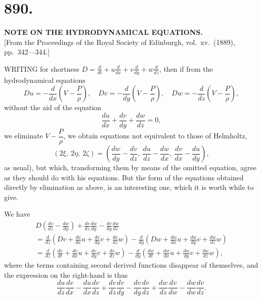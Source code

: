 \documentclass[11pt,a4paper]{book}
\begin{document}
\section*{890.}
\begin{center}
{\large\bfseries NOTE ON THE HYDRODYNAMICAL EQUATIONS.}\\[0.5em]
\small [From the Proceedings of the Royal Society of Edinburgh, vol.\ xv.\ (1889), pp.\ 342---344.]
\end{center}

WRITING for shortness $\displaystyle D = \frac{d}{dt} + u\frac{d}{dx} + v\frac{d}{dy} + w\frac{d}{dz}$, then if from the hydrodynamical equations
\[
Du = -\frac{d}{dx}\left(V - \frac{P}{\rho}\right),\quad Dv = -\frac{d}{dy}\left(V - \frac{P}{\rho}\right),\quad Dw = -\frac{d}{dz}\left(V - \frac{P}{\rho}\right),
\]
without the aid of the equation
\[
\frac{du}{dx} + \frac{dv}{dy} + \frac{dw}{dz} = 0,
\]
we eliminate $V - \dfrac{P}{\rho}$, we obtain equations not equivalent to those of Helmholtz,
\[
(2\xi,\ 2\eta,\ 2\zeta) = \left(\frac{dw}{dy} - \frac{dv}{dz},\ \frac{du}{dz} - \frac{dw}{dx},\ \frac{dv}{dx} - \frac{du}{dy}\right),
\]
as usual), but which, transforming them by means of the omitted equation, agree as they should do with his equations. But the form of the equations obtained directly by elimination as above, is an interesting one, which it is worth while to give.

We have
\begin{multline*}
D\left(\frac{dv}{dz} - \frac{dw}{dy}\right) + \frac{dv}{dz}\frac{dw}{dy} - \frac{dv}{dy}\frac{dw}{dz} \\
= \frac{d}{dz}\left(Dv + \frac{dv}{dx}u + \frac{dv}{dy}v + \frac{dv}{dz}w\right) - \frac{d}{dy}\left(Dw + \frac{dw}{dx}u + \frac{dw}{dy}v + \frac{dw}{dz}w\right) \\
= \frac{d}{dz}\left(\frac{dv}{dt} + \frac{dv}{dx}u + \frac{dv}{dy}v + \frac{dv}{dz}w\right) - \frac{d}{dy}\left(\frac{dw}{dt} + \frac{dw}{dx}u + \frac{dw}{dy}v + \frac{dw}{dz}w\right),
\end{multline*}
where the terms containing second derived functions disappear of themselves, and the expression on the right-hand is thus
\[
\frac{du}{dz}\frac{dv}{dx} - \frac{du}{dx}\frac{dv}{dz} + \frac{dv}{dz}\frac{dv}{dy} - \frac{dv}{dy}\frac{dv}{dz} + \frac{dw}{dz}\frac{dv}{dw} - \frac{dw}{dw}\frac{dv}{dz}.
\]
\end{document}
